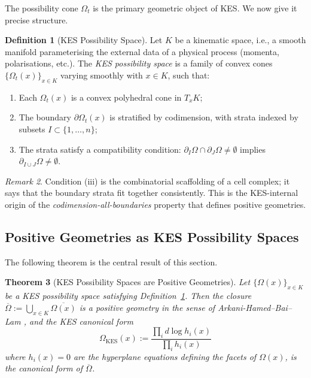 \documentclass[12pt, oneside]{amsart}
\theoremstyle{plain}
\newtheorem{theorem}{Theorem}[section]
\theoremstyle{definition}
\newtheorem{definition}[theorem]{Definition}
\theoremstyle{remark}
\newtheorem{remark}[theorem]{Remark}
\newcommand{\OmKS}{\Omega}
\newcommand{\CF}{\Omega}   %
\begin{document}
The possibility cone $\OmKS_t$ is the primary geometric object of KES. We now give it precise structure.

\begin{definition}[KES Possibility Space]
\label{def:kes-possibility}
Let $K$ be a kinematic space, i.e., a smooth manifold parameterising the external data of a physical process (momenta, polarisations, etc.). The \emph{KES possibility space} is a family of convex cones $\{\OmKS_t(x)\}_{x \in K}$ varying smoothly with $x \in K$, such that:
\begin{enumerate}[label=(\roman*)]
  \item Each $\OmKS_t(x)$ is a convex polyhedral cone in $T_x K$;
  \item The boundary $\partial\OmKS_t(x)$ is stratified by codimension, with strata indexed by subsets $I \subset \{1,\ldots,n\}$;
  \item The strata satisfy a compatibility condition: $\partial_I\OmKS \cap \partial_J\OmKS \neq \emptyset$ implies $\partial_{I\cup J}\OmKS \neq \emptyset$.
\end{enumerate}
\end{definition}

\begin{remark}
Condition (iii) is the combinatorial scaffolding of a cell complex; it says that the boundary strata fit together consistently. This is the KES-internal origin of the \emph{codimension-all-boundaries} property that defines positive geometries.
\end{remark}

\subsection{Positive Geometries as KES Possibility Spaces}

The following theorem is the central result of this section.

\begin{theorem}[KES Possibility Spaces are Positive Geometries]
\label{thm:kes-pg}
Let $\{\OmKS(x)\}_{x \in K}$ be a KES possibility space satisfying Definition~\ref{def:kes-possibility}. Then the closure $\overline{\OmKS} := \bigcup_{x \in K}\overline{\OmKS(x)}$ is a positive geometry in the sense of Arkani-Hamed--Bai--Lam \cite{ABL2017}, and the KES canonical form
\begin{equation}
\label{eq:kes-cf}
  \CF_{\text{KES}}(x) := \frac{\prod_{i} d\log h_i(x)}{\prod_{i}h_i(x)}
\end{equation}
where $h_i(x) = 0$ are the hyperplane equations defining the facets of $\OmKS(x)$, is the canonical form of $\overline{\OmKS}$.
\end{theorem}
\end{document}
